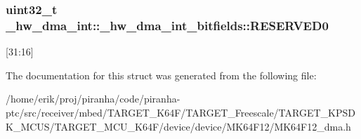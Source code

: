 \subsubsection[{\texorpdfstring{R\+E\+S\+E\+R\+V\+E\+D0}{RESERVED0}}]{\setlength{\rightskip}{0pt plus 5cm}uint32\+\_\+t \+\_\+hw\+\_\+dma\+\_\+int\+::\+\_\+hw\+\_\+dma\+\_\+int\+\_\+bitfields\+::\+R\+E\+S\+E\+R\+V\+E\+D0}\hypertarget{struct__hw__dma__int_1_1__hw__dma__int__bitfields_a04906fc822b0f25e285dab070469776a}{}\label{struct__hw__dma__int_1_1__hw__dma__int__bitfields_a04906fc822b0f25e285dab070469776a}
\mbox{[}31\+:16\mbox{]} 

The documentation for this struct was generated from the following file\+:\begin{DoxyCompactItemize}
\item 
/home/erik/proj/piranha/code/piranha-\/ptc/src/receiver/mbed/\+T\+A\+R\+G\+E\+T\+\_\+\+K64\+F/\+T\+A\+R\+G\+E\+T\+\_\+\+Freescale/\+T\+A\+R\+G\+E\+T\+\_\+\+K\+P\+S\+D\+K\+\_\+\+M\+C\+U\+S/\+T\+A\+R\+G\+E\+T\+\_\+\+M\+C\+U\+\_\+\+K64\+F/device/device/\+M\+K64\+F12/M\+K64\+F12\+\_\+dma.\+h\end{DoxyCompactItemize}
